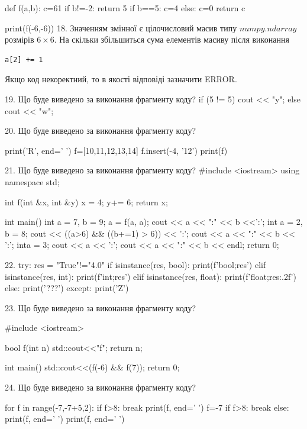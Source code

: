 \documentclass[11pt]{article}
\begin{document}
def f(a,b):
    c=61
    if b!=-2:
        return 5
    if b==5:
         c=4
    else: 
        c=0
    return c

print(f(-6,-6))
18. 
Значенням змінної  є цілочисловий масив типу $numpy.ndarray$ розмірів $6{\times}6$. На скільки збільшиться сума елементів масиву  після виконання
\begin{verbatim}
a[2] += 1
\end{verbatim}


Якщо код некоректний, то в якості відповіді зазначити ERROR.



19. Що буде виведено за виконання фрагменту коду?
if (5 != 5)
    cout << "y";
else
    cout << "w";


20. Що буде виведено за виконання фрагменту коду?

print('R', end=' ')
f=[10,11,12,13,14]
f.insert(-4, '12')
print(f)


21. Що буде виведено за виконання фрагменту коду?
#include <iostream>
using namespace std;

int f(int &x, int &y){
    x = 4;
    y+= 6;
    return x;
}

int main(){
    int a = 7, b = 9;
    a = f(a, a);
    cout << a << ":" << b <<':';
    {
        int a = 2, b = 8;
        cout << ((a>6) && ((b+=1) > 6)) << ':';
        cout << a << ":" << b << ':';
    }
    {
        inta = 3;
        cout << a << ':';
    }
    cout << a << ":" << b << endl;
    return 0;
}


22. 
try:
    res = "True"!="4.0"
    if isinstance(res, bool):
        print(f'bool;{res}')
    elif isinstance(res, int):
        print(f'int;{res}')
    elif isinstance(res, float):
        print(f'float;{res:.2f}')
    else:
        print('???')
except:
    print('Z')

23. Що буде виведено за виконання фрагменту коду?

#include <iostream>

bool f(int n){
    std::cout<<"f";
    return n;
}

int main(){
    std::cout<<(f(-6) && f(7));
    return 0;
}

24. Що буде виведено за виконання фрагменту коду?

for f in range(-7,-7+5,2):
    if f>8:
        break
    print(f, end=' ')
    f=-7
    if f>8:
        break
else:
    print(f, end=' ')
print(f, end=' ')
\end{document}
